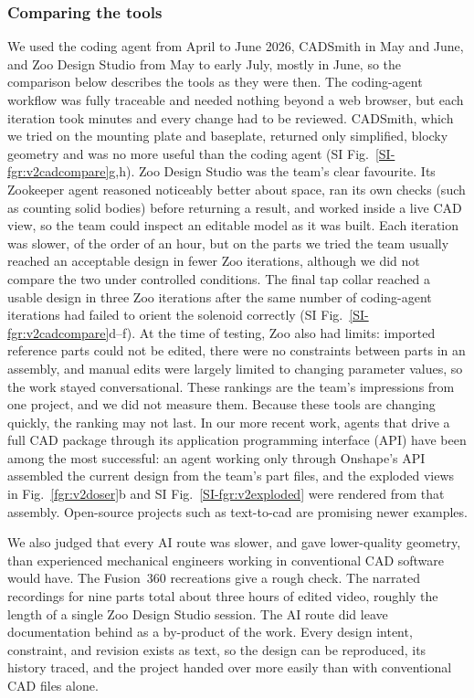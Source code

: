 \documentclass[twoside,twocolumn,9pt]{article}
\newcommand{\siref}[1]{\ref*{SI-#1}}
\begin{document}
\subsubsection{Comparing the tools}
We used the coding agent from April to June 2026, CADSmith in May and June, and Zoo Design Studio from May to early July, mostly in June, so the comparison below describes the tools as they were then. The coding-agent workflow was fully traceable and needed nothing beyond a web browser, but each iteration took minutes and every change had to be reviewed. CADSmith, which we tried on the mounting plate and baseplate, returned only simplified, blocky geometry and was no more useful than the coding agent (SI Fig.~\siref{fgr:v2cadcompare}g,h). Zoo Design Studio was the team's clear favourite. Its Zookeeper agent reasoned noticeably better about space, ran its own checks (such as counting solid bodies) before returning a result, and worked inside a live CAD view, so the team could inspect an editable model as it was built. Each iteration was slower, of the order of an hour, but on the parts we tried the team usually reached an acceptable design in fewer Zoo iterations, although we did not compare the two under controlled conditions. The final tap collar reached a usable design in three Zoo iterations after the same number of coding-agent iterations had failed to orient the solenoid correctly (SI Fig.~\siref{fgr:v2cadcompare}d--f). At the time of testing, Zoo also had limits: imported reference parts could not be edited, there were no constraints between parts in an assembly, and manual edits were largely limited to changing parameter values, so the work stayed conversational. These rankings are the team's impressions from one project, and we did not measure them. Because these tools are changing quickly, the ranking may not last. In our more recent work, agents that drive a full CAD package through its application programming interface (API) have been among the most successful: an agent working only through Onshape's API assembled the current design from the team's part files, and the exploded views in Fig.~\ref{fgr:v2doser}b and SI Fig.~\siref{fgr:v2exploded} were rendered from that assembly. Open-source projects such as text-to-cad\cite{TextToCad} are promising newer examples.

We also judged that every AI route was slower, and gave lower-quality geometry, than experienced mechanical engineers working in conventional CAD software would have. The Fusion~360 recreations give a rough check. The narrated recordings for nine parts total about three hours of edited video,\cite{FusionPlaylist} roughly the length of a single Zoo Design Studio session. The AI route did leave documentation behind as a by-product of the work. Every design intent, constraint, and revision exists as text, so the design can be reproduced, its history traced, and the project handed over more easily than with conventional CAD files alone.
\end{document}
